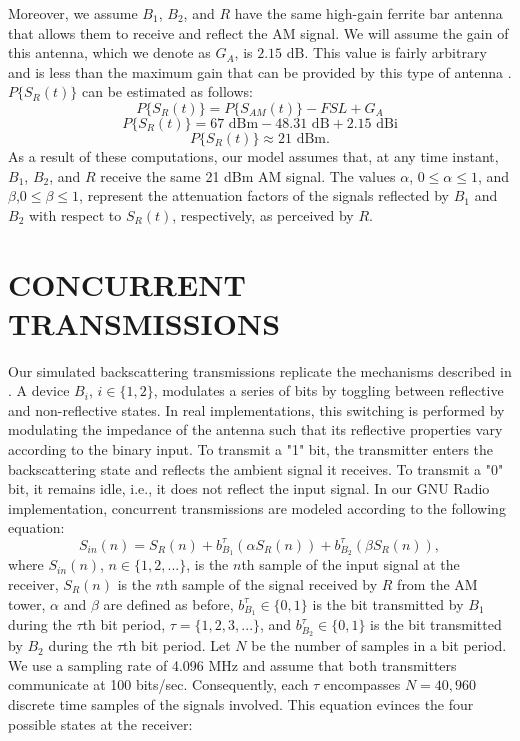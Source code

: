 \documentclass[letterpaper, 10 pt, conference]{IEEEconf}
\begin{document}
Moreover, we assume $B_1$, $B_2$, and $R$ have the same high-gain ferrite bar antenna that allows them to receive and reflect the AM signal. We will assume the gain of this antenna, which we denote as $G_A$, is $2.15$ dB. This value is fairly arbitrary and is less than the maximum gain that can be provided by this type of antenna \cite{ferrite_antenna}. $P\{S_{R}(t)\}$ can be estimated as follows:
$$P\{S_{R}(t)\}=P\{S_{AM}(t)\}-FSL+G_A$$
$$P\{S_{R}(t)\}=67 \text{ dBm} - 48.31 \text{ dB} + 2.15 \text{ dBi}$$
$$P\{S_{R}(t)\}\approx 21 \text{ dBm.}$$
As a result of these computations, our model assumes that, at any time instant, $B_1$, $B_2$, and $R$ receive the same 21 dBm AM signal. The values $\alpha$, $0 \leq \alpha \leq 1$, and $\beta$,$0 \leq \beta \leq 1$, represent the attenuation factors of the signals reflected by $B_1$ and $B_2$ with respect to $S_{R}(t)$, respectively, as perceived by $R$.

\section{CONCURRENT TRANSMISSIONS}

Our simulated backscattering transmissions replicate the mechanisms described in  \cite{liu2013ambient}. A device $B_i$, $i \in \{1,2\}$, modulates a series of bits by toggling between reflective and non-reflective states. In real implementations, this switching is performed by modulating the impedance of the antenna such that its reflective properties vary according to the binary input. To transmit a "1" bit, the transmitter enters the backscattering state and reflects the ambient signal it receives. To transmit a "0" bit, it remains idle, i.e., it does not reflect the input signal. In our GNU Radio implementation, concurrent transmissions are modeled according to the following equation:
$$S_{in}(n)= S_{R}(n) + b_{B_1}^\tau(\alpha S_{R}(n)) + b_{B_2}^\tau(\beta S_{R}(n)),$$
where $S_{in}(n)$, $n \in \{1,2,...\}$, is the $n$th sample of the input signal at the receiver, $S_{R}(n)$ is the $n$th sample of the signal received by $R$ from the AM tower, $\alpha$ and $\beta$ are defined as before, $b_{B_1}^\tau \in \{0,1\}$ is the bit transmitted by $B_1$ during the $\tau\text{th}$ bit period, $\tau=\{1,2,3,...\}$, and $b_{B_2}^\tau \in \{0,1\}$ is the bit transmitted by $B_2 $ during the $\tau\text{th}$ bit period. Let $N$ be the number of samples in a bit period. We use a sampling rate of 4.096 MHz and assume that both transmitters communicate at 100 bits/sec. Consequently, each $\tau$ encompasses $N=40,960$ discrete time samples of the signals involved. This equation evinces the four possible states at the receiver:
\end{document}
